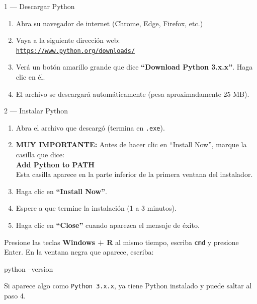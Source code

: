 \documentclass[12pt, letterpaper]{article}
\begin{document}
\begin{paso}{1 — Descargar Python}
  \begin{enumerate}[leftmargin=0.5cm, label=\textcolor{uninorteazul}{\arabic*.}]
    \item Abra su navegador de internet (Chrome, Edge, Firefox, etc.)
    \item Vaya a la siguiente dirección web:\\[4pt]
          \texttt{\href{https://www.python.org/downloads/}{https://www.python.org/downloads/}}
    \item Verá un botón amarillo grande que dice \textbf{``Download Python 3.x.x''}. Haga clic en él.
    \item El archivo se descargará automáticamente (pesa aproximadamente 25 MB).
  \end{enumerate}
\end{paso}

\begin{paso}{2 — Instalar Python}
  \begin{enumerate}[leftmargin=0.5cm, label=\textcolor{uninorteazul}{\arabic*.}]
    \item Abra el archivo que descargó (termina en \texttt{.exe}).
    \item \textbf{MUY IMPORTANTE:} Antes de hacer clic en ``Install Now'', marque la casilla que dice:\\[4pt]
          \colorbox{amarilloclaro}{\quad\faCheckSquare\; \textbf{Add Python to PATH}\quad}\\[4pt]
          Esta casilla aparece en la parte inferior de la primera ventana del instalador.
    \item Haga clic en \textbf{``Install Now''}.
    \item Espere a que termine la instalación (1 a 3 minutos).
    \item Haga clic en \textbf{``Close''} cuando aparezca el mensaje de éxito.
  \end{enumerate}
\end{paso}

\begin{aviso}
  Presione las teclas \textbf{Windows + R} al mismo tiempo, escriba \texttt{cmd} y presione Enter. En la ventana negra que aparece, escriba:
  \begin{comando}
    python --version
  \end{comando}
  Si aparece algo como \texttt{Python 3.x.x}, ya tiene Python instalado y puede saltar al paso 4.
\end{aviso}
\end{document}
